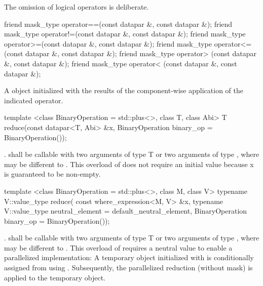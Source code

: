 \realnote The omission of logical operators is deliberate.

\begin{itemdecl}
friend mask_type operator==(const datapar &, const datapar &);
friend mask_type operator!=(const datapar &, const datapar &);
friend mask_type operator>=(const datapar &, const datapar &);
friend mask_type operator<=(const datapar &, const datapar &);
friend mask_type operator> (const datapar &, const datapar &);
friend mask_type operator< (const datapar &, const datapar &);
\end{itemdecl}
\begin{itemdescr}
  \pnum\returns A \mask object initialized with the results of the component-wise application of the indicated operator.
\end{itemdescr}

\begin{itemdecl}
template <class BinaryOperation = std::plus<>, class T, class Abi>
T reduce(const datapar<T, Abi> &x, BinaryOperation binary_op = BinaryOperation());
\end{itemdecl}
\begin{itemdescr}
  \pnum\returns {} \foralli.
  \pnum\requires {} shall be callable with two arguments of type \type T or two arguments of type \datapar[<T, A1>], where  may be different to .
  \pnum\realnote This overload of  does not require an initial value because \code x is guaranteed to be non-empty.
\end{itemdescr}

\begin{itemdecl}
template <class BinaryOperation = std::plus<>, class M, class V>
typename V::value_type reduce(
    const where_expression<M, V> &x,
    typename V::value_type neutral_element = default_neutral_element,
    BinaryOperation binary_op = BinaryOperation());
\end{itemdecl}
\begin{itemdescr}
  \pnum\returns {} .
  \pnum\requires {} shall be callable with two arguments of type \type T or two arguments of type \datapar[<T, A1>], where  may be different to .
  \pnum\realnote This overload of  requires a neutral value to enable a parallelized implementation:
  A temporary \datapar object initialized with  is conditionally assigned from  using .
  Subsequently, the parallelized reduction (without mask) is applied to the temporary object.
\end{itemdescr}

